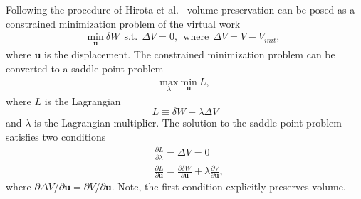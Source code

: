 \documentclass[12pt,aps,pre]{revtex4}
\begin{document}
Following the procedure of Hirota et al.\ \cite{Hirota:2000jw} volume preservation can be posed as a constrained minimization problem of the virtual work
%
\begin{equation}
\begin{aligned}
\underset{ \pmb{u}}{\text{min}} \ \delta W \ \ \text{s.t.} \ \ \Delta V = 0, \ \ \text{where} \ \ \Delta V = V - V_{init},\
\end{aligned}
\end{equation}
%
where $\pmb{u}$ is the displacement. The constrained minimization problem can be converted to a saddle point problem
%
\begin{equation}
\begin{aligned}
\underset{\lambda}{\text{max}} \ \underset{\pmb{u}}{\text{min}} \ L,
\end{aligned}
\end{equation}
%
where $L$ is the Lagrangian
%
\begin{equation}
L \equiv \delta W + \lambda \Delta V
\end{equation}
%
and $\lambda$ is the Lagrangian multiplier. The solution to the saddle point problem satisfies two conditions
%
\begin{equation}
\begin{aligned}
&\frac{\partial L}{\partial \lambda} = \Delta V = 0 \\
&\frac{\partial L}{\partial \pmb{u}} = \frac{\partial \delta W}{\partial \pmb{u}} + \lambda \frac{\partial V}{\partial \pmb{u}},
\end{aligned}
\label{eq:conditions}
\end{equation}
%
where $\partial \Delta V/\partial \pmb{u} = \partial V/\partial \pmb{u}$. Note, the first condition explicitly preserves volume. 
\end{document}
